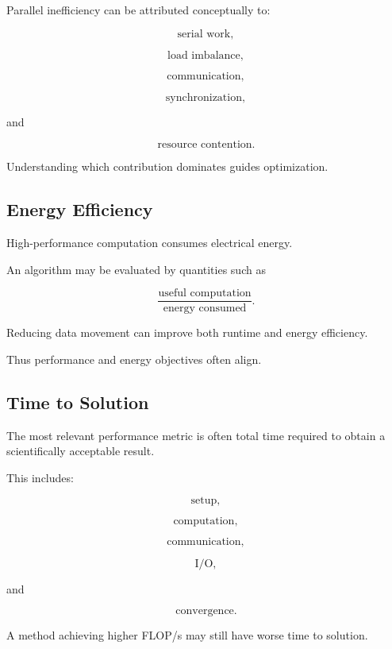 Parallel inefficiency can be attributed conceptually to:

\[
\boxed{
\text{serial work},
}
\]

\[
\boxed{
\text{load imbalance},
}
\]

\[
\boxed{
\text{communication},
}
\]

\[
\boxed{
\text{synchronization},
}
\]

and

\[
\boxed{
\text{resource contention}.
}
\]

Understanding which contribution dominates guides optimization.

\subsection{Energy Efficiency}
\label{subsec:hpmc-energy-efficiency}

High-performance computation consumes electrical energy.

An algorithm may be evaluated by quantities such as

\[
\boxed{
\frac{
\text{useful computation}
}{
\text{energy consumed}
}.
}
\]

Reducing data movement can improve both runtime and energy efficiency.

Thus performance and energy objectives often align.

\subsection{Time to Solution}
\label{subsec:time-to-solution}

The most relevant performance metric is often total time required to obtain
a scientifically acceptable result.

This includes:

\[
\boxed{
\text{setup},
}
\]

\[
\boxed{
\text{computation},
}
\]

\[
\boxed{
\text{communication},
}
\]

\[
\boxed{
\text{I/O},
}
\]

and

\[
\boxed{
\text{convergence}.
}
\]

A method achieving higher FLOP/s may still have worse time to solution.

